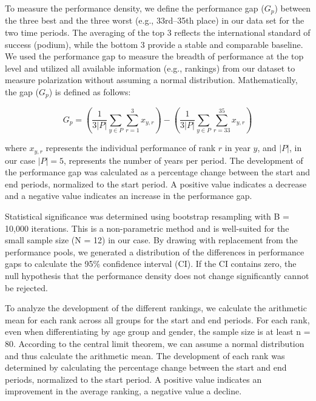 \documentclass{article}
\begin{document}
To measure the performance density, we define the performance gap ($G_p$) between the three best and the three worst (e.g., 33rd–35th place) in our data set for the two time periods. The averaging of the top 3 reflects the international standard of success (podium), while the bottom 3 provide a stable and comparable baseline. We used the performance gap to measure the breadth of performance at the top level and utilized all available information (e.g., rankings) from our dataset to measure polarization without assuming a normal distribution. Mathematically, the gap ($G_p$) is defined as follows:

\begin{equation}
G_p = \left( \frac{1}{3|P|} \sum_{y \in P} \sum_{r=1}^{3} x_{y,r} \right) - \left( \frac{1}{3|P|}  \sum_{y \in P} \sum_{r=33}^{35} x_{y,r} \right)
\end{equation}

where $x_{y,r}$ represents the individual performance of rank $r$ in year $y$, and $|P|$, in our case $|P|=5$, represents the number of years per period. The development of the performance gap was calculated as a percentage change between the start and end periods, normalized to the start period. A positive value indicates a decrease and a negative value indicates an increase in the performance gap.

Statistical significance was determined using bootstrap resampling with B = 10,000 iterations. This is a non-parametric method and is well-suited for the small sample size (N = 12) in our case. By drawing with replacement from the performance pools, we generated a distribution of the differences in performance gaps to calculate the 95\% confidence interval (CI). If the CI contains zero, the null hypothesis that the performance density does not change significantly cannot be rejected.

To analyze the development of the different rankings, we calculate the arithmetic mean for each rank across all groups for the start and end periods. For each rank, even when differentiating by age group and gender, the sample size is at least n = 80. According to the central limit theorem, we can assume a normal distribution and thus calculate the arithmetic mean. The development of each rank was determined by calculating the percentage change between the start and end periods, normalized to the start period. A positive value indicates an improvement in the average ranking, a negative value a decline.
\end{document}
